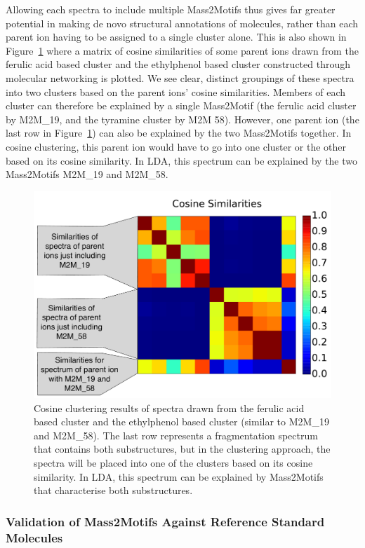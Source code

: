 Allowing each spectra to include multiple Mass2Motifs thus gives far greater potential in making de novo structural annotations of molecules, rather than each parent ion having to be assigned to a single cluster alone. This is also shown in Figure~\ref{fig:m2lda-cosine-clustering} where a matrix of cosine similarities of some parent ions drawn from the ferulic acid based cluster and the ethylphenol based cluster constructed through molecular networking is plotted. We see clear, distinct groupings of these spectra into two clusters based on the parent ions’ cosine similarities. Members of each cluster can therefore be explained by a single Mass2Motif (the ferulic acid cluster by M2M_19, and the tyramine cluster by M2M 58). However, one parent ion (the last row in Figure~\ref{fig:m2lda-cosine-clustering}) can also be explained by the two Mass2Motifs together. In cosine clustering, this parent ion would have to go into one cluster or the other based on its cosine similarity. In LDA, this spectrum can be explained by the two Mass2Motifs M2M_19 and M2M_58.

\begin{figure}[!htbp]
\centering\includegraphics[width=0.6\linewidth]{07-lda/figures/figure10.pdf}
\centering\caption{Cosine clustering results of spectra drawn from the ferulic acid based cluster and the ethylphenol based cluster (similar to M2M_19 and M2M_58). The last row represents a fragmentation spectrum that contains both substructures, but in the clustering approach, the spectra will be placed into one of the clusters based on its cosine similarity. In LDA, this spectrum can be explained by Mass2Motifs that characterise both substructures.\label{fig:m2lda-cosine-clustering}}
\end{figure}

\subsubsection{Validation of Mass2Motifs Against Reference Standard Molecules}

